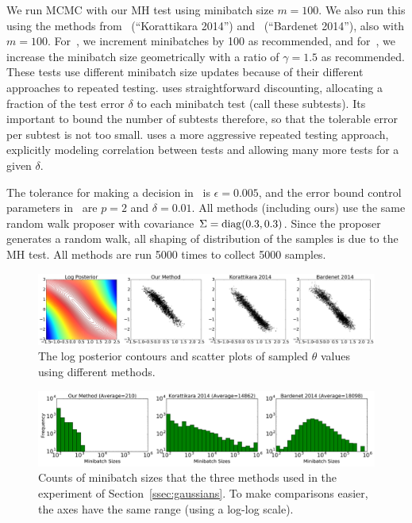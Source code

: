 \documentclass{article}
\begin{document}
We run MCMC with our MH test using minibatch size $m=100$.  We also run this
using the methods from~\cite{cutting_mh_2014} (``Korattikara 2014'')
and~\cite{icml2014c1_bardenet14} (``Bardenet 2014''), also with $m=100$.
For~\cite{cutting_mh_2014}, we increment minibatches by 100 as recommended, and
for~\cite{icml2014c1_bardenet14}, we increase the minibatch size geometrically
with a ratio of $\gamma = 1.5$ as recommended. These tests use different
minibatch size updates because of their different approaches to repeated
testing. \cite{icml2014c1_bardenet14} uses straightforward discounting,
allocating a fraction of the test error $\delta$ to each minibatch test (call
these subtests). Its important to bound the number of subtests therefore, so
that the tolerable error per subtest is not too small.  \cite{cutting_mh_2014}
uses a more aggressive repeated testing approach, explicitly modeling
correlation between tests and allowing many more tests for a given $\delta$. 

The tolerance for making a decision in~\cite{cutting_mh_2014} is
$\epsilon=0.005$, and the error bound control parameters
in~\cite{icml2014c1_bardenet14} are $p = 2$ and $\delta = 0.01$.  All methods
(including ours) use the same random walk proposer with covariance $\Sigma={\rm
diag}(0.3, 0.3)$.  Since the proposer generates a random walk, all shaping of
distribution of the samples is due to the MH test. All methods are run 5000
times to collect 5000 samples.

\begin{figure}[t]
    \centering
    \includegraphics[width=1\linewidth]{GaussianMixtureResult/posterior_of_gaussian.png}
    \caption{
    The log posterior contours and scatter plots of sampled $\theta$ values
    using different methods. 
    }
    \label{fig:gauss_mix_1}
\end{figure}

\begin{figure}[t]
    \centering
    \includegraphics[width=1\linewidth]{minibatch_size_gaussian.png}
    \caption{
    Counts of minibatch sizes that the three methods used in the experiment of
    Section~\ref{ssec:gaussians}. To make comparisons easier, the axes have the
    same range (using a log-log scale).
    }
    \label{fig:gauss_mix_2}
\end{figure}
\end{document}
